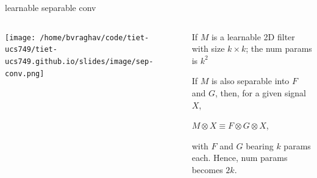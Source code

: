 \documentclass[aspectratio=169,xcolor={dvipsnames,svgnames}]{beamer}
\begin{document}
\begin{frame}[label={sec:orgaac7e23}]{learnable separable conv}
\begin{columns}
\begin{column}{.5\columnwidth}
\begin{center}
\texttt{[image: /home/bvraghav/code/tiet-ucs749/tiet-ucs749.github.io/slides/image/sep-conv.png]}
\end{center}
\end{column}

\begin{column}{.5\columnwidth}
If \(M\) is a learnable 2D filter with size \(k\times k\);
the num params is \(k^{2}\)

{\vspace{0.3\baselineskip}}

If \(M\) is also separable into \(F\) and \(G\), then, for a
given signal \(X\),

\(M\otimes X \equiv F\otimes G\otimes X\),

with \(F\) and \(G\) bearing \(k\) params each.  Hence, num
params becomes \(2k\).
\end{column}
\end{columns}
\end{frame}
\end{document}
